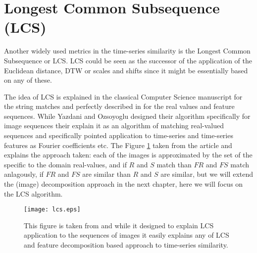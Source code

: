 \section{Longest Common Subsequence (LCS) }
Another widely used metrics in the time-series similarity is the Longest Common Subsequence or LCS. LCS could be seen as the successor of the application of the Euclidean distance, DTW or scales and shifts \cite{citeulike:3816327} since it might be essentially based on any of these. 

The idea of LCS is explained in the classical Computer Science manuscript \cite{citeulike:180287} for the string matches and perfectly described in \cite{citeulike:4367061} for the real values and feature sequences. While Yazdani and Ozsoyoglu designed their algorithm specifically for image sequences their explain it as an algorithm of matching real-valued sequences and specifically pointed application to time-series and time-series features as Fourier coefficients etc. The Figure \ref{fig:lcs} taken from the article and explains the approach taken: each of the images is approximated by the set of the specific to the domain real-values, and if $R$ and $S$ match than $FR$ and $FS$ match anlagously, if $FR$ and $FS$ are similar than $R$ and $S$ are similar, but we will extend the (image) decomposition approach in the next chapter, here we will focus on the LCS algorithm.

\begin{figure}[tbp]
   \centering
   \texttt{[image: lcs.eps]}
   \caption{This figure is taken from \cite{citeulike:4367061} and while it designed to explain LCS application to the sequences of images it easily explains any of LCS and feature decomposition based approach to time-series similarity.}
   \label{fig:lcs}
\end{figure} 


